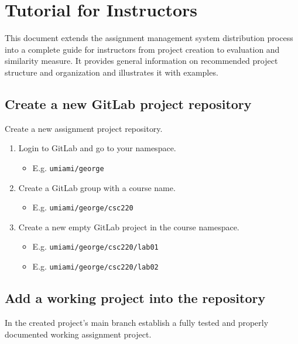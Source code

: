 \chapter{Tutorial for Instructors} \label{apx:tut-ins}

{This document extends the assignment management system distribution process into a complete guide for instructors from project creation to evaluation and similarity measure. It provides general information on recommended project structure and organization and illustrates it with examples.}

\section{Create a new GitLab project repository} \label{ssec:createnewglrep}

{Create a new assignment project repository.}

\begin{enumerate}
\item
  {Login to GitLab and go to your namespace.}
    \begin{itemize}
    \item
      {E.g. \texttt{umiami/george}}
    \end{itemize}
\item
  {Create a GitLab group with a course name.}
    \begin{itemize}
    \item
      {E.g. \texttt{umiami/george/csc220}}
    \end{itemize}
\item
  {Create a new empty GitLab project in the course namespace.}
    \begin{itemize}
    \item
      {E.g. \texttt{umiami/george/csc220/lab01}}
    \item
      {E.g. \texttt{umiami/george/csc220/lab02}}
    \end{itemize}
\end{enumerate}

\section{Add a working project into the repository} \label{ssec:addworking}

{In the created project's main branch establish a fully tested and properly documented working assignment project.}

